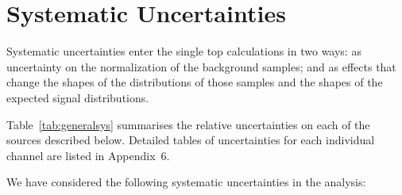 %

\section{Systematic Uncertainties}
\label{systematics}

Systematic uncertainties enter the single top calculations in two
ways: as uncertainty on the normalization of the background samples;
and as effects that change the shapes of the distributions of those
samples and the shapes of the expected signal distributions.

Table~\ref{tab:generalsys} summarises the relative uncertainties on
each of the sources described below. Detailed tables of uncertainties
for each individual channel are listed in Appendix~6.

We have considered the following systematic uncertainties in the
analysis:

